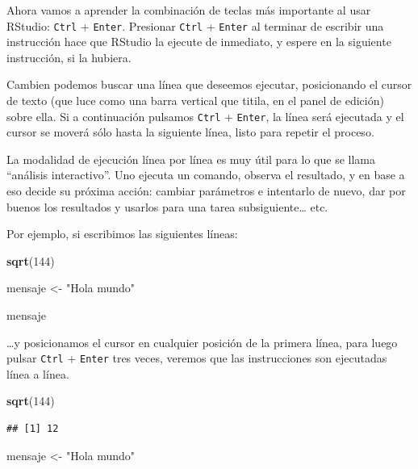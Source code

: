 \documentclass[]{book}
\newenvironment{Shaded}{\begin{snugshade}}{\end{snugshade}}
\newcommand{\KeywordTok}[1]{\textcolor[rgb]{0.13,0.29,0.53}{\textbf{#1}}}
\newcommand{\DecValTok}[1]{\textcolor[rgb]{0.00,0.00,0.81}{#1}}
\newcommand{\StringTok}[1]{\textcolor[rgb]{0.31,0.60,0.02}{#1}}
\newcommand{\NormalTok}[1]{#1}
\begin{document}
Ahora vamos a aprender la combinación de teclas más importante al usar
RStudio: \texttt{Ctrl} + \texttt{Enter}. Presionar \texttt{Ctrl} +
\texttt{Enter} al terminar de escribir una instrucción hace que RStudio
la ejecute de inmediato, y espere en la siguiente instrucción, si la
hubiera.

Cambien podemos buscar una línea que deseemos ejecutar, posicionando el
cursor de texto (que luce como una barra vertical que titila, en el
panel de edición) sobre ella. Si a continuación pulsamos \texttt{Ctrl} +
\texttt{Enter}, la línea será ejecutada y el cursor se moverá sólo hasta
la siguiente línea, listo para repetir el proceso.

La modalidad de ejecución línea por línea es muy útil para lo que se
llama ``análisis interactivo''. Uno ejecuta un comando, observa el
resultado, y en base a eso decide su próxima acción: cambiar parámetros
e intentarlo de nuevo, dar por buenos los resultados y usarlos para una
tarea subsiguiente\ldots{} etc.

Por ejemplo, si escribimos las siguientes líneas:

\begin{Shaded}
\begin{Highlighting}[]
\KeywordTok{sqrt}\NormalTok{(}\DecValTok{144}\NormalTok{)}

\NormalTok{mensaje <-}\StringTok{ "Hola mundo"}

\NormalTok{mensaje}
\end{Highlighting}
\end{Shaded}

\ldots{}y posicionamos el cursor en cualquier posición de la primera
línea, para luego pulsar \texttt{Ctrl} + \texttt{Enter} tres veces,
veremos que las instrucciones son ejecutadas línea a línea.

\begin{Shaded}
\begin{Highlighting}[]
\KeywordTok{sqrt}\NormalTok{(}\DecValTok{144}\NormalTok{)}
\end{Highlighting}
\end{Shaded}

\begin{verbatim}
## [1] 12
\end{verbatim}

\begin{Shaded}
\begin{Highlighting}[]
\NormalTok{mensaje <-}\StringTok{ "Hola mundo"}
\end{Highlighting}
\end{Shaded}
\end{document}
